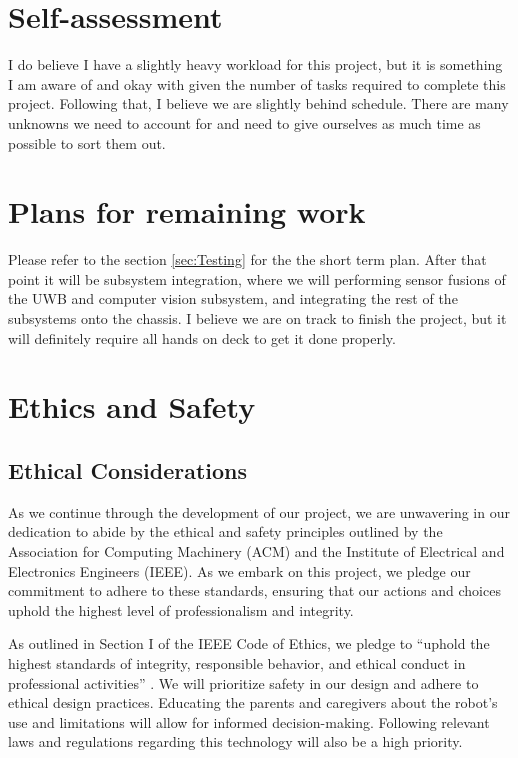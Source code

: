 \documentclass{report}
\begin{document}
    \section{Self-assessment}
    I do believe I have a slightly heavy workload for this project, but it is something I am aware of and okay with given the number of tasks required to complete this project. Following that, I believe we are slightly behind schedule. There are many unknowns we need to account for and need to give ourselves as much time as possible to sort them out.

    \section{Plans for remaining work}
    Please refer to the section \ref{sec:Testing} for the the short term plan. After that point it will be subsystem integration, where we will performing sensor fusions of the UWB and computer vision subsystem, and integrating the rest of the subsystems onto the chassis. I believe we are on track to finish the project, but it will definitely require all hands on deck to get it done properly.

    \section{Ethics and Safety}
    \subsection{Ethical Considerations}
    As we continue through the development of our project, we are unwavering in our dedication to abide by the ethical and safety principles outlined by the Association for Computing Machinery (ACM) and the Institute of Electrical and Electronics Engineers (IEEE). As we embark on this project, we pledge our commitment to adhere to these standards, ensuring that our actions and choices uphold the highest level of professionalism and integrity.

    As outlined in Section I of the IEEE Code of Ethics, we pledge to “uphold the highest standards of integrity, responsible behavior, and ethical conduct in professional activities” \cite{IEEE_2020}. We will prioritize safety in our design and adhere to ethical design practices. Educating the parents and caregivers about the robot’s use and limitations will allow for informed decision-making. Following relevant laws and regulations regarding this technology will also be a high priority.
\end{document}
